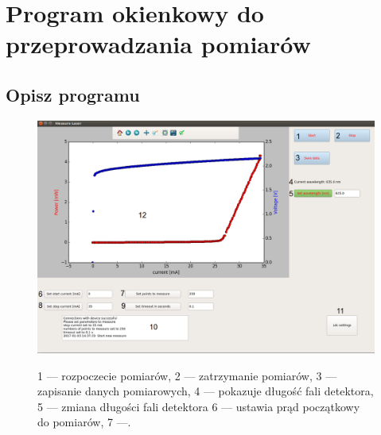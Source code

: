 \documentclass[a4paper, portrait,12pt]{mwrep}
\begin{document}
\chapter{Program okienkowy do przeprowadzania pomiarów}
\section{Opisz programu}
\begin{figure}[h]
\center
  \includegraphics[scale=0.35]{gui.png}
  \label{rys1}
  \caption{1 --- rozpoczecie pomiarów, 2 --- zatrzymanie pomiarów, 3 --- zapisanie danych pomiarowych, 4 --- pokazuje długość fali detektora, 5 --- zmiana długości fali detektora 6 --- ustawia prąd początkowy do pomiarów, 7 ---.} 
\end{figure}
\end{document}
